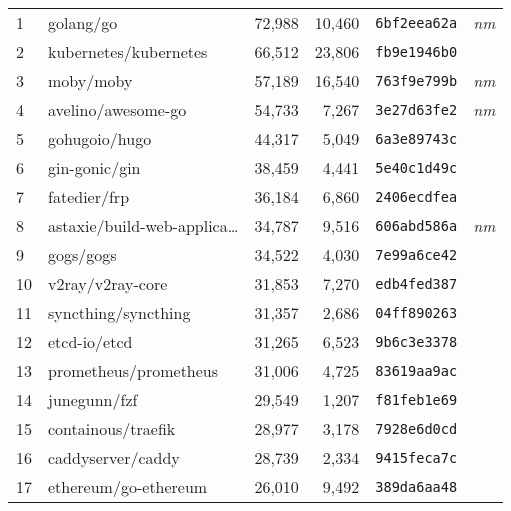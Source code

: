{\fontsize{5.3}{6}\selectfont
    \begin{supertabular}{llrrll}

        1   &                          golang/go & 72,988 & 10,460 &  \texttt{6bf2eea62a} &  \textit{nm} \\
        2   &              kubernetes/kubernetes & 66,512 & 23,806 &  \texttt{fb9e1946b0} &              \\
        3   &                          moby/moby & 57,189 & 16,540 &  \texttt{763f9e799b} &  \textit{nm} \\
        4   &                 avelino/awesome-go & 54,733 &  7,267 &  \texttt{3e27d63fe2} &  \textit{nm} \\
        5   &                      gohugoio/hugo & 44,317 &  5,049 &  \texttt{6a3e89743c} &              \\
        6   &                      gin-gonic/gin & 38,459 &  4,441 &  \texttt{5e40c1d49c} &              \\
        7   &                       fatedier/frp & 36,184 &  6,860 &  \texttt{2406ecdfea} &              \\
        8   &    astaxie/build-web-applica\ldots & 34,787 &  9,516 &  \texttt{606abd586a} &  \textit{nm} \\
        9   &                          gogs/gogs & 34,522 &  4,030 &  \texttt{7e99a6ce42} &              \\
        10  &                   v2ray/v2ray-core & 31,853 &  7,270 &  \texttt{edb4fed387} &              \\
        11  &                syncthing/syncthing & 31,357 &  2,686 &  \texttt{04ff890263} &              \\
        12  &                       etcd-io/etcd & 31,265 &  6,523 &  \texttt{9b6c3e3378} &              \\
        13  &              prometheus/prometheus & 31,006 &  4,725 &  \texttt{83619aa9ac} &              \\
        14  &                       junegunn/fzf & 29,549 &  1,207 &  \texttt{f81feb1e69} &              \\
        15  &                 containous/traefik & 28,977 &  3,178 &  \texttt{7928e6d0cd} &              \\
        16  &                  caddyserver/caddy & 28,739 &  2,334 &  \texttt{9415feca7c} &              \\
        17  &               ethereum/go-ethereum & 26,010 &  9,492 &  \texttt{389da6aa48} &              \\

\end{supertabular}}
